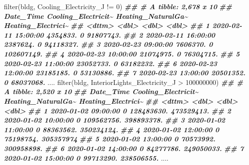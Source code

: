 \documentclass[
]{book}
\newenvironment{Shaded}{\begin{snugshade}}{\end{snugshade}}
\newcommand{\DecValTok}[1]{\textcolor[rgb]{0.00,0.00,0.81}{#1}}
\newcommand{\DocumentationTok}[1]{\textcolor[rgb]{0.56,0.35,0.01}{\textbf{\textit{#1}}}}
\newcommand{\FunctionTok}[1]{\textcolor[rgb]{0.00,0.00,0.00}{#1}}
\newcommand{\NormalTok}[1]{#1}
\newcommand{\SpecialCharTok}[1]{\textcolor[rgb]{0.00,0.00,0.00}{#1}}
\begin{document}
\begin{Shaded}
\begin{Highlighting}[]
\FunctionTok{filter}\NormalTok{(bldg, Cooling\_Electricity\_J }\SpecialCharTok{!=} \DecValTok{0}\NormalTok{)}
\DocumentationTok{\#\# \# A tibble: 2,678 x 10}
\DocumentationTok{\#\#    Date\_Time           Cooling\_Electricit\textasciitilde{} Heating\_NaturalGa\textasciitilde{} Heating\_Electrici\textasciitilde{}}
\DocumentationTok{\#\#    \textless{}dttm\textgreater{}                            \textless{}dbl\textgreater{}              \textless{}dbl\textgreater{}              \textless{}dbl\textgreater{}}
\DocumentationTok{\#\#  1 2020{-}02{-}11 15:00:00            4354833.                  0          91807743.}
\DocumentationTok{\#\#  2 2020{-}02{-}11 16:00:00            2387624.                  0          94118327.}
\DocumentationTok{\#\#  3 2020{-}02{-}23 09:00:00            7606370.                  0         102607149.}
\DocumentationTok{\#\#  4 2020{-}02{-}23 10:00:00           21074975.                  0          76304715.}
\DocumentationTok{\#\#  5 2020{-}02{-}23 11:00:00           23052733.                  0          63182232.}
\DocumentationTok{\#\#  6 2020{-}02{-}23 12:00:00           23185185.                  0          53130886.}
\DocumentationTok{\#\#  7 2020{-}02{-}23 13:00:00           20501352.                  0          68037068.}
\NormalTok{....}
\FunctionTok{filter}\NormalTok{(bldg, InteriorLights\_Electricity\_J }\SpecialCharTok{\textgreater{}} \DecValTok{100000000}\NormalTok{)}
\DocumentationTok{\#\# \# A tibble: 2,520 x 10}
\DocumentationTok{\#\#    Date\_Time           Cooling\_Electricit\textasciitilde{} Heating\_NaturalGa\textasciitilde{} Heating\_Electrici\textasciitilde{}}
\DocumentationTok{\#\#    \textless{}dttm\textgreater{}                            \textless{}dbl\textgreater{}              \textless{}dbl\textgreater{}              \textless{}dbl\textgreater{}}
\DocumentationTok{\#\#  1 2020{-}01{-}02 09:00:00                   0         128483630.         473529413.}
\DocumentationTok{\#\#  2 2020{-}01{-}02 10:00:00                   0         109562756.         398893378.}
\DocumentationTok{\#\#  3 2020{-}01{-}02 11:00:00                   0          88363562.         350234124.}
\DocumentationTok{\#\#  4 2020{-}01{-}02 12:00:00                   0          75198754.         305357974 }
\DocumentationTok{\#\#  5 2020{-}01{-}02 13:00:00                   0          70573992.         300958898.}
\DocumentationTok{\#\#  6 2020{-}01{-}02 14:00:00                   0          84277786.         249050033.}
\DocumentationTok{\#\#  7 2020{-}01{-}02 15:00:00                   0          99713290.         238506555.}
\NormalTok{....}


\end{Highlighting}
\end{Shaded}
\end{document}
